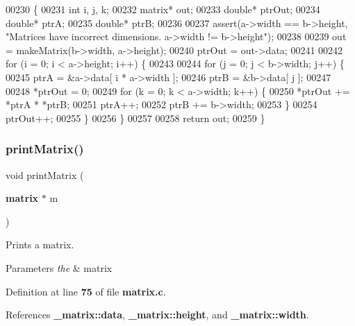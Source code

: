 \begin{DoxyCode}
00230                                              \{
00231     \textcolor{keywordtype}{int} i, j, k;
00232     matrix* out;
00233     \textcolor{keywordtype}{double}* ptrOut;
00234     \textcolor{keywordtype}{double}* ptrA;
00235     \textcolor{keywordtype}{double}* ptrB;
00236 
00237     assert(a->width == b->height, \textcolor{stringliteral}{"Matrices have incorrect dimensions. a->width != b->height"});
00238 
00239     out = makeMatrix(b->width, a->height);
00240     ptrOut = out->data;
00241 
00242     \textcolor{keywordflow}{for} (i = 0; i < a->height; i++) \{
00243 
00244         \textcolor{keywordflow}{for} (j = 0; j < b->width; j++) \{
00245             ptrA = &a->data[ i * a->width ];
00246             ptrB = &b->data[ j ];
00247 
00248             *ptrOut = 0;
00249             \textcolor{keywordflow}{for} (k = 0; k < a->width; k++) \{
00250                 *ptrOut += *ptrA * *ptrB;
00251                 ptrA++;
00252                 ptrB += b->width;
00253             \}
00254             ptrOut++;
00255         \}
00256     \}
00257 
00258     \textcolor{keywordflow}{return} out;
00259 \}
\end{DoxyCode}
\mbox{\label{matrix_8h_a50ab2b1ac33d6993d93522fc4f30a051}} 
\subsubsection{print\+Matrix()}
{\footnotesize\ttfamily void print\+Matrix (\begin{DoxyParamCaption}\item[{\textbf{ matrix} $\ast$}]{m }\end{DoxyParamCaption})}



Prints a matrix. 


\begin{DoxyParams}{Parameters}
{\em the} & matrix \\
\hline
\end{DoxyParams}


Definition at line \textbf{ 75} of file \textbf{ matrix.\+c}.



References \textbf{ \+\_\+matrix\+::data}, \textbf{ \+\_\+matrix\+::height}, and \textbf{ \+\_\+matrix\+::width}.


